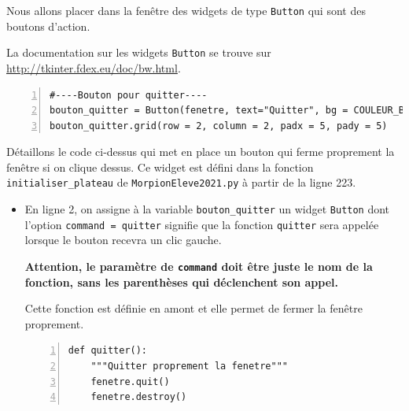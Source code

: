 \documentclass[a4paper, french, 12pt]{article}  %
\newcounter{act}
\newcounter{def}
\newcounter{prop}
\begin{document}
Nous allons placer dans la fenêtre des  widgets de type  \lstinline+Button+ qui sont des boutons d'action.  

La documentation sur les widgets \lstinline+Button+ se trouve sur \url{http://tkinter.fdex.eu/doc/bw.html}.

\begin{lstlisting}[numbers=left]
#----Bouton pour quitter----
bouton_quitter = Button(fenetre, text="Quitter", bg = COULEUR_BOUTON, relief = 'raised',  command = quitter)
bouton_quitter.grid(row = 2, column = 2, padx = 5, pady = 5)
\end{lstlisting}

Détaillons le code ci-dessus qui met en place un bouton qui ferme proprement la fenêtre si on clique dessus. Ce widget est défini dans la fonction \lstinline+initialiser_plateau+ de \texttt{MorpionEleve2021.py} à partir de la ligne 223.


\begin{itemize}[label=]
	\item En ligne 2, on assigne à la variable \lstinline+bouton_quitter+  un widget \lstinline+Button+ dont l'option \lstinline+command = quitter+ signifie que la fonction \lstinline+quitter+ sera appelée lorsque le bouton recevra un clic gauche. 
	
{\bfseries \bcattention{} Attention, le paramètre de \lstinline+command+ doit être juste le nom de la fonction, sans les parenthèses qui déclenchent son appel. }


	
	Cette fonction est définie en amont et elle permet de fermer la fenêtre proprement.

\begin{lstlisting}[numbers=left]
def quitter():
    """Quitter proprement la fenetre"""
    fenetre.quit()
    fenetre.destroy()
\end{lstlisting}
	
\end{itemize}
\end{document}
